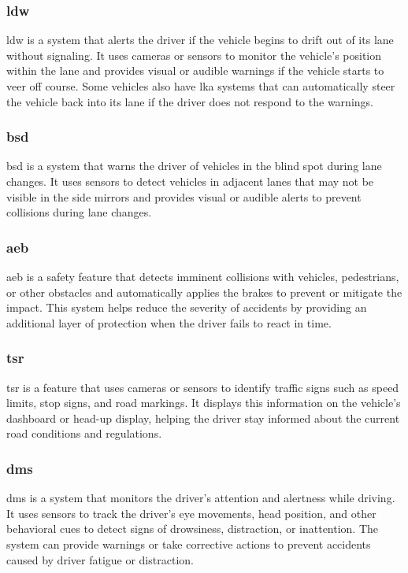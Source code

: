\subsubsection*{\ac{ldw}}
\ac{ldw} is a system that alerts the driver if the vehicle begins to drift out 
of its lane without signaling. It uses cameras or sensors to monitor the vehicle's 
position within the lane and provides visual or audible warnings if the vehicle 
starts to veer off course. Some vehicles also have \ac{lka} systems that can 
automatically steer the vehicle back into its lane if the driver does not respond 
to the warnings.

\subsubsection*{\ac{bsd}}
\ac{bsd} is a system that warns the driver of vehicles in the blind spot during
lane changes. It uses sensors to detect vehicles in adjacent lanes that may not
be visible in the side mirrors and provides visual or audible alerts to prevent
collisions during lane changes.

\subsubsection*{\ac{aeb}}
\ac{aeb} is a safety feature that detects imminent collisions with vehicles,
pedestrians, or other obstacles and automatically applies the brakes to prevent
or mitigate the impact. This system helps reduce the severity of accidents by
providing an additional layer of protection when the driver fails to react in
time.

\subsubsection*{\ac{tsr}}
\ac{tsr} is a feature that uses cameras or sensors to identify traffic signs
such as speed limits, stop signs, and road markings. It displays this information
on the vehicle's dashboard or head-up display, helping the driver stay informed
about the current road conditions and regulations.

\subsubsection*{\ac{dms}}
\ac{dms} is a system that monitors the driver's attention and alertness while
driving. It uses sensors to track the driver's eye movements, head position, and
other behavioral cues to detect signs of drowsiness, distraction, or inattention.
The system can provide warnings or take corrective actions to prevent accidents
caused by driver fatigue or distraction.
%
